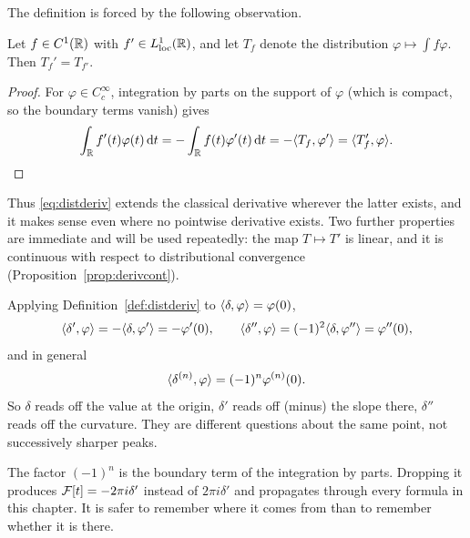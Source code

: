 The definition is forced by the following observation.

\begin{proposition}[compatibility]\label{prop:compat}
Let $f\in C^{1}(\mathbb{R})$ with $f'\in L^{1}_{\mathrm{loc}}(\mathbb{R})$, and let $T_{f}$ denote the distribution
$\varphi\mapsto\int f\varphi$. Then $T_{f}'=T_{f'}$.
\end{proposition}

\begin{proof}
For $\varphi\in C_{c}^{\infty}$, integration by parts on the support of $\varphi$ (which is compact,
so the boundary terms vanish) gives
\begin{equation}
\int_{\mathbb{R}}f'(t)\varphi(t)\,\mathrm{d} t=-\int_{\mathbb{R}}f(t)\varphi'(t)\,\mathrm{d} t
=-\langle T_{f},\varphi'\rangle=\langle T_{f}',\varphi\rangle. \qedhere
\end{equation}
\end{proof}

Thus \eqref{eq:distderiv} extends the classical derivative wherever the latter exists, and it makes
sense even where no pointwise derivative exists. Two further properties are immediate and will be
used repeatedly: the map $T\mapsto T'$ is linear, and it is continuous with respect to distributional
convergence (Proposition~\ref{prop:derivcont}).

\begin{example}\label{ex:deltan}
Applying Definition~\ref{def:distderiv} to $\langle \delta,\varphi\rangle=\varphi(0)$,
\begin{equation}
\langle \delta',\varphi\rangle=-\langle \delta,\varphi'\rangle=-\varphi'(0),
\qquad
\langle \delta'',\varphi\rangle=(-1)^{2}\langle \delta,\varphi''\rangle=\varphi''(0),
\end{equation}
and in general
\begin{equation}
\langle \delta^{(n)},\varphi\rangle=(-1)^{n}\varphi^{(n)}(0).
\label{eq:deltan}
\end{equation}
So $\delta$ reads off the value at the origin, $\delta'$ reads off (minus) the slope there,
$\delta''$ reads off the curvature. They are different questions about the same point, not
successively sharper peaks.
\end{example}

\begin{remark}
The factor $(-1)^{n}$ is the boundary term of the integration by parts. Dropping it produces
$\mathcal{F}[t]=-2\pi i\delta'$ instead of $2\pi i\delta'$ and propagates through every formula in this
chapter. It is safer to remember where it comes from than to remember whether it is there.
\end{remark}

